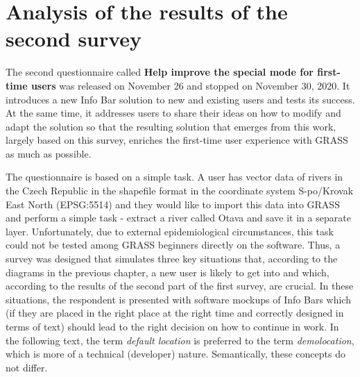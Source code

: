 \documentclass[a4paper,10pt,twoside]{article}
\begin{document}

\newpage
\vspace*{-1cm}
\section{Analysis of the results of the second survey}
\label{sec:qstat2}

\noindent The second questionnaire called \textbf{Help improve the
  special mode for first-time users} was released on November 26 and
stopped on November 30, 2020. It introduces a new Info Bar solution to
new and existing users and tests its success. At the same time, it
addresses users to share their ideas on how to modify and adapt the
solution so that the resulting solution that emerges from this work,
largely based on this survey, enriches the first-time user experience
with GRASS as much as possible.

The questionnaire is based on a simple task. A user has vector data of
rivers in the Czech Republic in the shapefile format in the coordinate
system S-po/Krovak East North (EPSG:5514) and they would like to
import this data into GRASS and perform a simple task - extract a
river called Otava and save it in a separate layer. Unfortunately, due
to external epidemiological circumstances, this task could not be
tested among GRASS beginners directly on the software. Thus, a survey
was designed that simulates three key situations that, according to
the diagrams in the previous chapter, a new user is likely to get into
and which, according to the results of the second part of the first
survey, are crucial. In these situations, the respondent is presented
with software mockups of Info Bars which (if they are placed in the
right place at the right time and correctly designed in terms of text)
should lead to the right decision on how to continue in work. In the
following text, the term \textit{default location} is preferred to the
term \textit{demolocation}, which is more of a technical (developer)
nature. Semantically, these concepts do not differ.
\end{document}
